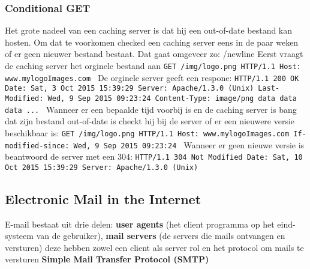 \subsubsection*{Conditional GET}
Het grote nadeel van een caching server is dat hij een out-of-date bestand kan hosten. Om dat te voorkomen checked een caching server eens in de paar weken of er geen nieuwer bestand bestaat. Dat gaat omgeveer zo:
/newline
Eerst vraagt de caching server het orginele bestand aan \newline
\texttt{GET /img/logo.png HTTP/1.1 \newline
		Host: www.mylogoImages.com \newline \newline
	}
De orginele server geeft een respone: \newline
\texttt{HTTP/1.1 200 OK \newline
		Date: Sat, 3 Oct 2015 15:39:29 \newline
		Server: Apache/1.3.0 (Unix) \newline
		Last-Modified: Wed, 9 Sep 2015 09:23:24 \newline
		Content-Type: image/png \newline \newline
		data data data ... \newline}
Wanneer er een bepaalde tijd voorbij is en de caching server is bang dat zijn bestand out-of-date is checkt hij bij de server of er een nieuwere versie beschikbaar is: \newline
\texttt{GET /img/logo.png HTTP/1.1 \newline
	Host: www.mylogoImages.com \newline
	If-modified-since: Wed, 9 Sep 2015 09:23:24 \newline \newline
}
Wanneer er geen nieuwe versie is beantwoord de server met een $304$: \newline
\texttt{HTTP/1.1 304 Not Modified \newline
	Date: Sat, 10 Oct 2015 15:39:29 \newline
	Server: Apache/1.3.0 (Unix) \newline}
	
\subsection{Electronic Mail in the Internet}
E-mail bestaat uit drie delen: \textbf{user agents} (het client programma op het eind-systeem van de gebruiker), \textbf{mail servers} (de servers die mails ontvangen en versturen) deze hebben zowel een client als server rol en het protocol om mails te versturen \textbf{Simple Mail Transfer Protocol (SMTP)}
